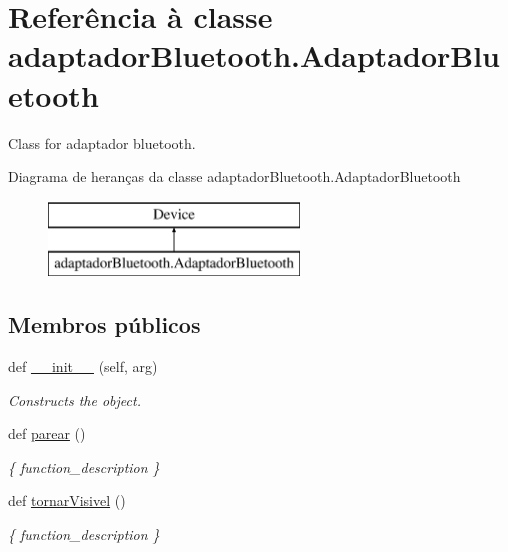 \hypertarget{classadaptador_bluetooth_1_1_adaptador_bluetooth}{}\section{Referência à classe adaptador\+Bluetooth.\+Adaptador\+Bluetooth}
\label{classadaptador_bluetooth_1_1_adaptador_bluetooth}


Class for adaptador bluetooth.  


Diagrama de heranças da classe adaptador\+Bluetooth.\+Adaptador\+Bluetooth\begin{figure}[H]
\begin{center}
\leavevmode
\includegraphics[height=2.000000cm]{classadaptador_bluetooth_1_1_adaptador_bluetooth}
\end{center}
\end{figure}
\subsection*{Membros públicos}
\begin{DoxyCompactItemize}
\item 
def \hyperlink{classadaptador_bluetooth_1_1_adaptador_bluetooth_a11e812b23e047752d56486e4b327077d}{\+\_\+\+\_\+init\+\_\+\+\_\+} (self, arg)
\begin{DoxyCompactList}\small\item\em Constructs the object. \end{DoxyCompactList}\item 
def \hyperlink{classadaptador_bluetooth_1_1_adaptador_bluetooth_a9c32b04776ece3fdc29dd9b88c006d73}{parear} ()
\begin{DoxyCompactList}\small\item\em \{ function\+\_\+description \} \end{DoxyCompactList}\item 
def \hyperlink{classadaptador_bluetooth_1_1_adaptador_bluetooth_aeb85cf48ef2abf3bdcd0135aa6765078}{tornar\+Visivel} ()
\begin{DoxyCompactList}\small\item\em \{ function\+\_\+description \} \end{DoxyCompactList}\end{DoxyCompactItemize}
